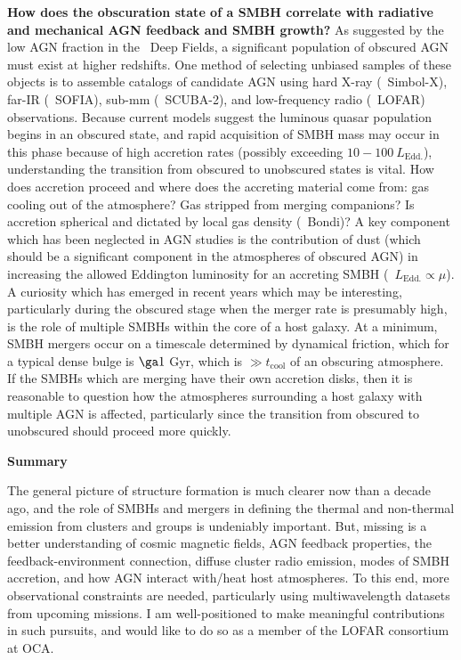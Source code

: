 \documentclass[11pt]{article}
\begin{document}
{\bf{How does the obscuration state of a SMBH correlate with radiative
    and mechanical AGN feedback and SMBH growth?}} As suggested by the
low AGN fraction in the \chandra\ Deep Fields, a significant
population of obscured AGN must exist at higher redshifts. One method
of selecting unbiased samples of these objects is to assemble catalogs
of candidate AGN using hard X-ray (\ie\ Simbol-X), far-IR
(\ie\ SOFIA), sub-mm (\ie\ SCUBA-2), and low-frequency radio
(\ie\ LOFAR) observations. Because current models suggest the luminous
quasar population begins in an obscured state, and rapid acquisition
of SMBH mass may occur in this phase because of high accretion rates
(possibly exceeding $10-100~L_{\mathrm{Edd.}}$), understanding the
transition from obscured to unobscured states is vital. How does
accretion proceed and where does the accreting material come from: gas
cooling out of the atmosphere? Gas stripped from merging companions?
Is accretion spherical and dictated by local gas density (\eg\ Bondi)?
A key component which has been neglected in AGN studies is the
contribution of dust (which should be a significant component in the
atmospheres of obscured AGN) in increasing the allowed Eddington
luminosity for an accreting SMBH (\ie\ $L_{\mathrm{Edd.}} \propto
\mu$). A curiosity which has emerged in recent years which may be
interesting, particularly during the obscured stage when the merger
rate is presumably high, is the role of multiple SMBHs within the core
of a host galaxy. At a minimum, SMBH mergers occur on a timescale
determined by dynamical friction, which for a typical dense bulge is
$\ga 1$ Gyr, which is $\gg t_{\mathrm{cool}}$ of an obscuring
atmosphere. If the SMBHs which are merging have their own accretion
disks, then it is reasonable to question how the atmospheres
surrounding a host galaxy with multiple AGN is affected, particularly
since the transition from obscured to unobscured should proceed more
quickly.

{\bf{Summary}}


The general picture of structure formation is much clearer now than a
decade ago, and the role of SMBHs and mergers in defining the thermal
and non-thermal emission from clusters and groups is undeniably
important. But, missing is a better understanding of cosmic magnetic
fields, AGN feedback properties, the feedback-environment connection,
diffuse cluster radio emission, modes of SMBH accretion, and how AGN
interact with/heat host atmospheres. To this end, more observational
constraints are needed, particularly using multiwavelength datasets
from upcoming missions. I am well-positioned to make meaningful
contributions in such pursuits, and would like to do so as a member of
the LOFAR consortium at OCA.

\scriptsize


 
\end{document}
